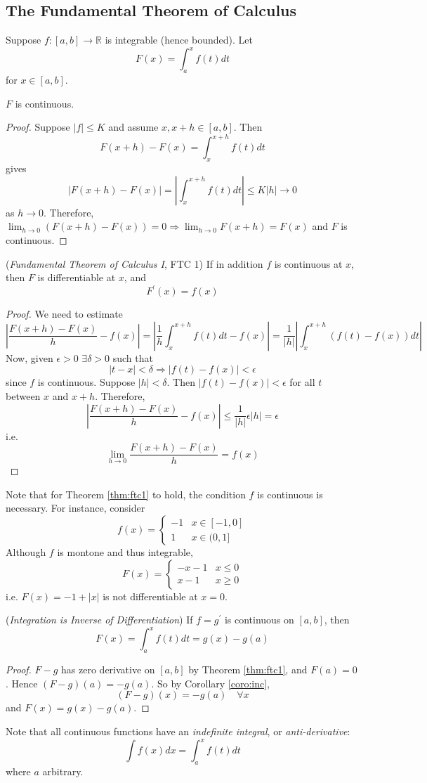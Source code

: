 \documentclass[10pt, a4paper, twoside]{report}
\begin{document}
\subsection{The Fundamental Theorem of Calculus} 
Suppose \(f:[a,b]\to\mathbb{R}\) is integrable (hence bounded). Let 
\[F(x)=\int_a^xf(t)dt\]
for \(x\in[a,b]\).
\begin{theorem}
    \(F\) is continuous.
\end{theorem}
\begin{proof}
    Suppose \(|f|\leq K\) and assume \(x,x+h\in[a,b]\). Then 
    \[F(x+h)-F(x)=\int_x^{x+h}f(t)dt\]
    gives 
    \[|F(x+h)-F(x)|=\left|\int_x^{x+h}f(t)dt\right|\leq K|h|\to 0\]
    as \(h\to 0\). Therefore, \(\lim_{h\to 0}(F(x+h)-F(x))=0\Rightarrow\lim_{h\to 0}F(x+h)=F(x)\) and \(F\) is continuous.
\end{proof}
\begin{theorem}
    (\emph{Fundamental Theorem of Calculus I}, FTC 1) If in addition \(f\) is continuous at \(x\), then \(F\) is differentiable at \(x\), and 
    \[F^\prime(x)=f(x)\]
    \label{thm:ftc1}
\end{theorem}
\begin{proof}
    We need to estimate 
    \[\left|\frac{F(x+h)-F(x)}{h}-f(x)\right|=\left|\frac 1h\int_x^{x+h}f(t)dt-f(x)\right|=\frac 1{|h|}\left|\int_x^{x+h}(f(t)-f(x))dt\right|\]
    Now, given \(\epsilon>0\) \(\exists\delta>0\) such that 
    \[|t-x|<\delta\Rightarrow|f(t)-f(x)|<\epsilon\]
    since \(f\) is continuous. Suppose \(|h|<\delta\). Then \(|f(t)-f(x)|<\epsilon\) for all \(t\) between \(x\) and \(x+h\). Therefore, 
    \[\left|\frac{F(x+h)-F(x)}{h}-f(x)\right|\leq\frac 1{|h|}\epsilon|h|=\epsilon\]
    i.e.
    \[\lim_{h\to 0}\frac{F(x+h)-F(x)}{h}=f(x)\]
\end{proof}
Note that for Theorem \ref{thm:ftc1} to hold, the condition \(f\) is continuous is necessary. For instance, consider 
\[f(x)=\begin{cases}
    -1 & x\in[-1,0] \\
    1 & x\in (0,1]
\end{cases}\]
Although \(f\) is montone and thus integrable, 
\[F(x)=\begin{cases}
    -x-1 & x\leq 0 \\
    x-1 & x\geq 0
\end{cases}\]
i.e. \(F(x)=-1+|x|\) is not differentiable at \(x=0\).
\begin{corollary}
    (\emph{Integration is Inverse of Differentiation}) If \(f=g^\prime\) is continuous on \([a,b]\), then 
    \[F(x)=\int_a^xf(t)dt=g(x)-g(a)\]
    \label{coro:intdiffrel}
\end{corollary}
\begin{proof}
    \(F-g\) has zero derivative on \([a,b]\) by Theorem \ref{thm:ftc1}, and \(F(a)=0\). Hence \((F-g)(a)=-g(a)\). So by Corollary \ref{coro:inc}, 
    \[(F-g)(x)=-g(a)\quad\forall x\]
    and \(F(x)=g(x)-g(a)\).
\end{proof}
Note that all continuous functions have an \emph{indefinite integral}, or \emph{anti-derivative}:
\[\int f(x)dx=\int_a^xf(t)dt\]
where \(a\) arbitrary.
\end{document}
